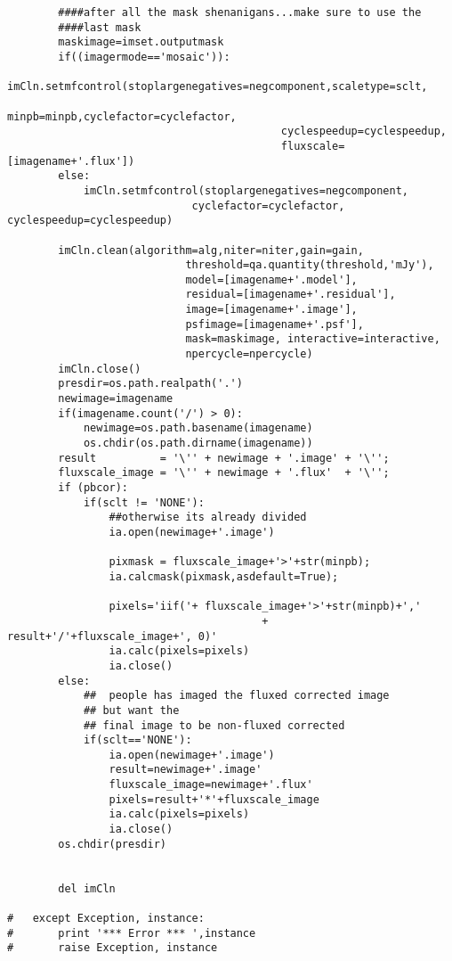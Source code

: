 \begin{verbatim}
		####after all the mask shenanigans...make sure to use the
		####last mask
		maskimage=imset.outputmask
		if((imagermode=='mosaic')):
			imCln.setmfcontrol(stoplargenegatives=negcomponent,scaletype=sclt,
                                           minpb=minpb,cyclefactor=cyclefactor,
                                           cyclespeedup=cyclespeedup,
                                           fluxscale=[imagename+'.flux'])
		else:
			imCln.setmfcontrol(stoplargenegatives=negcomponent,
                             cyclefactor=cyclefactor, cyclespeedup=cyclespeedup)
			
		imCln.clean(algorithm=alg,niter=niter,gain=gain,
                            threshold=qa.quantity(threshold,'mJy'),
                            model=[imagename+'.model'],
                            residual=[imagename+'.residual'],
                            image=[imagename+'.image'], 
                            psfimage=[imagename+'.psf'], 
                            mask=maskimage, interactive=interactive, 
                            npercycle=npercycle)
		imCln.close()
		presdir=os.path.realpath('.')
		newimage=imagename
		if(imagename.count('/') > 0):
			newimage=os.path.basename(imagename)
			os.chdir(os.path.dirname(imagename))
		result          = '\'' + newimage + '.image' + '\'';
		fluxscale_image = '\'' + newimage + '.flux'  + '\'';
		if (pbcor):
			if(sclt != 'NONE'):
				##otherwise its already divided
				ia.open(newimage+'.image')
				
				pixmask = fluxscale_image+'>'+str(minpb);
				ia.calcmask(pixmask,asdefault=True);

				pixels='iif('+ fluxscale_image+'>'+str(minpb)+','
                                        + result+'/'+fluxscale_image+', 0)'
				ia.calc(pixels=pixels)
				ia.close()
		else:
			##  people has imaged the fluxed corrected image
			## but want the
			## final image to be non-fluxed corrected
			if(sclt=='NONE'):
				ia.open(newimage+'.image')
				result=newimage+'.image'
				fluxscale_image=newimage+'.flux'
				pixels=result+'*'+fluxscale_image
				ia.calc(pixels=pixels)
				ia.close()
		os.chdir(presdir)

		
		del imCln

#	except Exception, instance:
#		print '*** Error *** ',instance
#		raise Exception, instance

\end{verbatim}
